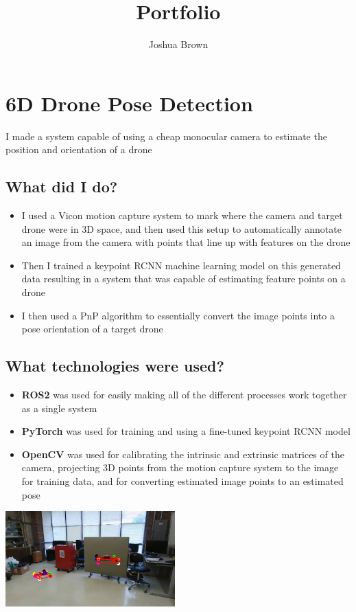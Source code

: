 \documentclass{article}
\title{Portfolio}
\author{Joshua Brown}
\begin{document}
\maketitle

\section*{6D Drone Pose Detection}
I made a system capable of using a cheap monocular camera to estimate the position and orientation of a drone

\begin{multicols}{2}
    \subsection*{What did I do?}
    \begin{itemize}
        \item I used a Vicon motion capture system to mark where the camera and target drone were in 3D space, and then used this setup to automatically annotate an image from the camera with points that line up with features on the drone
        \item Then I trained a keypoint RCNN machine learning model on this generated data resulting in a system that was capable of estimating feature points on a drone
        \item I then used a PnP algorithm to essentially convert the image points into a pose orientation of a target drone
    \end{itemize}
    
    \subsection*{What technologies were used?}
    \begin{itemize}
        \item \textbf{ROS2} was used for easily making all of the different processes work together as a single system
        \item \textbf{PyTorch} was used for training and using a fine-tuned keypoint RCNN model
        \item \textbf{OpenCV} was used for calibrating the intrinsic and extrinsic matrices of the camera, projecting 3D points from the motion capture system to the image for training data, and for converting estimated image points to an estimated pose
    \end{itemize}
    \vspace{10cm}
    \begin{center}
        \includegraphics[width=0.49\textwidth]{images/pose_detection_picture.png}
    \end{center}
\end{multicols}
\end{document}
